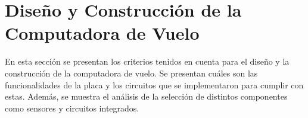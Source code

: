 \section{Diseño y Construcción de la Computadora de Vuelo}



En esta sección se presentan los criterios tenidos en cuenta para el diseño y la construcción de la computadora de vuelo. Se presentan cuáles son las funcionalidades de la placa y los circuitos que se implementaron para cumplir con estas. Además, se muestra el análisis de la selección de distintos componentes como sensores y circuitos integrados.









